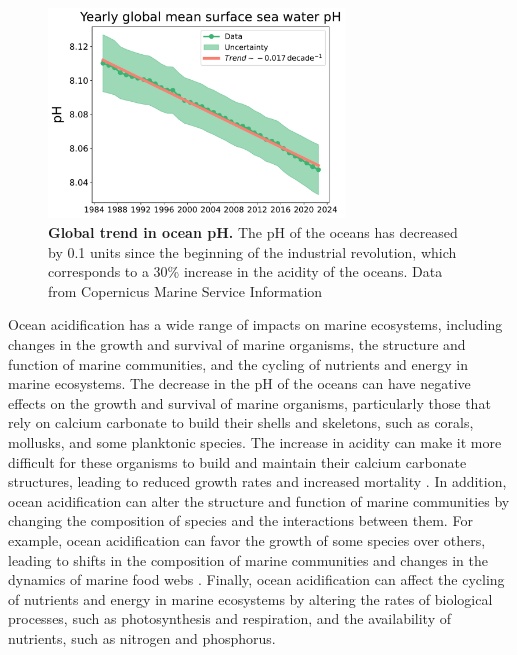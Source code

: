 \begin{figure}[H]
  \centering
  \includegraphics[width=0.7\textwidth]{Figures/Ocean_acidification.pdf}
  \caption[Global trend in ocean pH]{
    \textbf{Global trend in ocean pH.} The pH of the oceans has decreased by
    0.1 units since the beginning of the industrial revolution, which
    corresponds to a 30\% increase in the acidity of the oceans. Data from
    Copernicus Marine Service Information \cite{CMEMS2024}}
  \label{fig:Ocean_acidification}
\end{figure}

Ocean acidification has a wide range of impacts on marine ecosystems,
including changes in the growth and survival of marine organisms, the
structure
and function of marine communities, and the cycling of nutrients and energy
in
marine ecosystems. The decrease in the pH of the oceans can have negative
effects on the growth and survival of marine organisms, particularly those
that
rely on calcium carbonate to build their shells and skeletons, such as
corals,
mollusks, and some planktonic species. The increase in acidity can make it
more
difficult for these organisms to build and maintain their calcium carbonate
structures, leading to reduced growth rates and increased mortality
\cite{kroeker2013impacts}. In addition, ocean acidification can alter the
structure and function of marine communities by changing the composition of
species and the interactions between them. For example, ocean acidification
can
favor the growth of some species over others, leading to shifts in the
composition of marine communities and changes in the dynamics of marine food
webs \cite{hendriks2015biological}. Finally, ocean acidification can affect
the
cycling of nutrients and energy in marine ecosystems by altering the rates of
biological processes, such as photosynthesis and respiration, and the
availability of nutrients, such as nitrogen and phosphorus.

